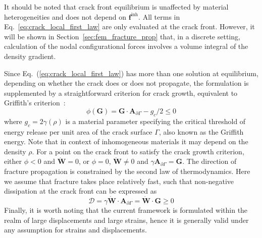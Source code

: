 \documentclass[onecolumn]{svjour3}
\begin{document}
It should be noted that crack front equilibrium is unaffected by material heterogeneities and does not depend on $\mathbf f^{\mathrm {inh}}$. All terms in Eq.~\ref{eq:crack_local_first_law} are only evaluated at the crack front. However, it will be shown in Section~\ref{sec:fem_fracture_prop} that, in a discrete setting, calculation of the nodal configurational forces involves a volume integral of the density gradient.

Since Eq.~(\ref{eq:crack_local_first_law}) has more than one solution at equilibrium, depending on whether the crack 
does or does not propagate, the formulation is supplemented by a straightforward criterion for crack growth, equivalent to Griffith's  criterion~\cite{kaczmarczyk2017energy}:
\begin{equation} \label{eq:grif1}
\phi(\mathbf{G}) = 
\mathbf{G} \cdot \mathbf{A}_{\partial\Gamma} - g_c/2 \leq 0
\end{equation} 
where $g_c=2\gamma(\rho)$ is a material parameter specifying the critical threshold of energy release
per unit area of the crack surface $\Gamma$, also known as the Griffith energy. Note that in context of inhomogeneous materials it may depend on the density $\rho$. For a point on the crack front to satisfy the crack growth criterion, 
either $\phi<0$ and $\dot{\mathbf{W}}=0$, or $\phi=0$, $\dot{\mathbf{W}}\ne 0$ and $\gamma\mathbf{A}_{\partial\Gamma}=\mathbf{G}$. 
% 
% 
The direction of fracture propagation is
constrained by the second law of thermodynamics. Here we assume that fracture takes place
relatively fast, 
such that non-negative dissipation at the crack front can be expressed as
\begin{equation}
	\mathcal{D} = \gamma \dot{\mathbf{W}} \cdot \mathbf{A}_{\partial\Gamma}= \dot{\mathbf{W}} \cdot \mathbf{G}\ge0
	\label{eq:max_dissp}
\end{equation}
% 
Finally, it is worth noting that the current framework is formulated within 
the realm of large displacements and large strains, hence it 
is generally valid under any assumption for strains and displacements. 
\end{document}
